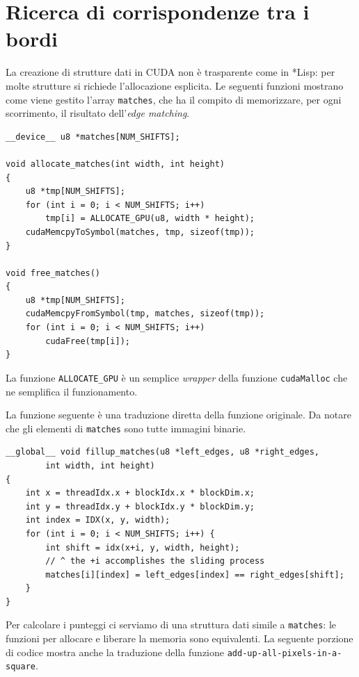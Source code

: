 \documentclass[12pt,a4paper,openright,twoside]{report}
\begin{document}
\section{Ricerca di corrispondenze tra i bordi}

La creazione di strutture dati in CUDA non è trasparente come in *Lisp: per molte strutture si richiede l'allocazione esplicita. Le seguenti funzioni mostrano come viene gestito l'array \verb|matches|, che ha il compito di memorizzare, per ogni scorrimento, il risultato dell'\textit{edge matching}.

\begin{lstlisting}[style=mystyle]
__device__ u8 *matches[NUM_SHIFTS];

void allocate_matches(int width, int height)
{
    u8 *tmp[NUM_SHIFTS];
    for (int i = 0; i < NUM_SHIFTS; i++)
        tmp[i] = ALLOCATE_GPU(u8, width * height);
    cudaMemcpyToSymbol(matches, tmp, sizeof(tmp));
}

void free_matches()
{
    u8 *tmp[NUM_SHIFTS];
    cudaMemcpyFromSymbol(tmp, matches, sizeof(tmp));
    for (int i = 0; i < NUM_SHIFTS; i++)
        cudaFree(tmp[i]);
}
\end{lstlisting}

La funzione \verb|ALLOCATE_GPU| è un semplice \textit{wrapper} della funzione \verb|cudaMalloc| che ne semplifica il funzionamento.

La funzione seguente è una traduzione diretta della funzione originale. Da notare che gli elementi di \verb|matches| sono tutte immagini binarie.

\begin{lstlisting}[style=mystyle]
__global__ void fillup_matches(u8 *left_edges, u8 *right_edges,
        int width, int height)
{
    int x = threadIdx.x + blockIdx.x * blockDim.x;
    int y = threadIdx.y + blockIdx.y * blockDim.y;
    int index = IDX(x, y, width);
    for (int i = 0; i < NUM_SHIFTS; i++) {
        int shift = idx(x+i, y, width, height);
        // ^ the +i accomplishes the sliding process
        matches[i][index] = left_edges[index] == right_edges[shift];
    }
}
\end{lstlisting}

Per calcolare i punteggi ci serviamo di una struttura dati simile a \verb|matches|: le funzioni per allocare e liberare la memoria sono equivalenti. La seguente porzione di codice mostra anche la traduzione della funzione \verb|add-up-all-pixels-in-a-square|.
\end{document}

